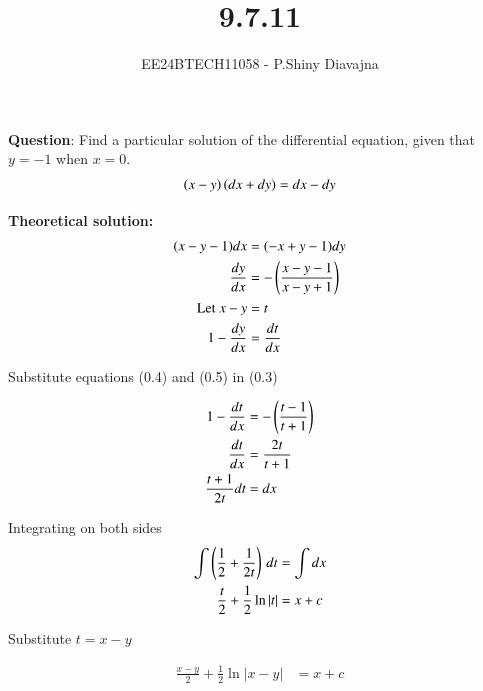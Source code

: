 \documentclass[journal]{IEEEtran}
\begin{document}

\vspace{3cm}

\title{9.7.11}
\author{EE24BTECH11058 - P.Shiny Diavajna}
{\let\newpage\relax\maketitle}

\renewcommand{\thefigure}{\theenumi}
\renewcommand{\thetable}{\theenumi}
\setlength{\intextsep}{10pt} %


\renewcommand{\thetable}{\theenumi}


\textbf{Question}: Find a particular solution of the differential equation, given that
$y=-1$ when $x=0$.
\begin{align}
  \left(x-y\right)\left(dx+dy\right)=dx-dy
\end{align}

\textbf{Theoretical solution:}
 \begin{align}
 (x-y-1)dx&=(-x+y-1)dy\\
 \frac{dy}{dx}&=-\left(\frac{x-y-1}{x-y+1}\right)\\
 \text{Let } x-y&=t\\
 1-\frac{dy}{dx}&=\frac{dt}{dx}
\end{align}

Substitute equations (0.4) and (0.5) in (0.3)

\begin{align}
    1-\frac{dt}{dx}&=-\left(\frac{t-1}{t+1}\right)\\
    \frac{dt}{dx}&=\frac{2t}{t+1}\\
    \frac{t+1}{2t} dt&=dx
\end{align}

Integrating on both sides 
\begin{align}
\int \left(\frac{1}{2} + \frac{1}{2t}\right) \, dt &= \int dx\\
\frac{t}{2}+\frac{1}{2}\ln{|t|} &=x+c
\end{align}

Substitute $t=x-y$

\begin{align}
      \frac{x-y}{2}+\frac{1}{2}\ln{|x-y|}&=x+c
\end{align}
\end{document}
